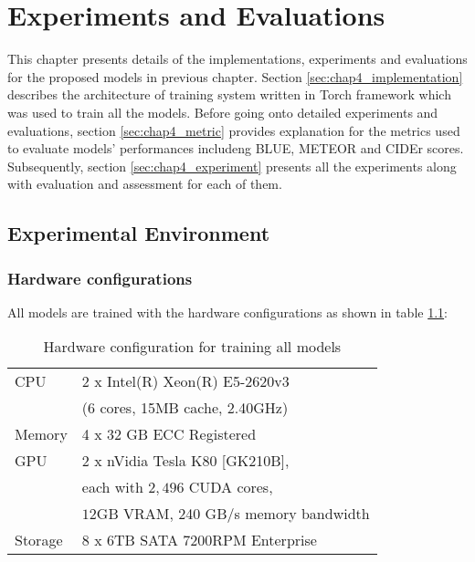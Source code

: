 \chapter{Experiments and Evaluations}
\label{chap:experiments}

This chapter presents details of the implementations, experiments and evaluations for the proposed models in previous chapter. Section \ref{sec:chap4_implementation} describes the architecture of training system written in Torch framework which was used to train all the models. Before going onto detailed experiments and evaluations, section \ref{sec:chap4_metric} provides explanation for the metrics used to evaluate models' performances includeng BLUE, METEOR and CIDEr scores. Subsequently, section \ref{sec:chap4_experiment} presents all the experiments along with evaluation and assessment for each of them.


\section{Experimental Environment}
\label{sec:chap4_environment}

\subsection{Hardware configurations}
\label{sec:hardware}
All models are trained with the hardware configurations as shown in table \ref{tab:hardware_configuration}:

\begin{table}
	\centering
	\caption{Hardware configuration for training all models}	
	\label{tab:hardware_configuration}
	\begin{tabularx}{0.65\textwidth}{ll}
		\toprule
		CPU & 2 x Intel(R) Xeon(R) E5-2620v3 \\
			& (6 cores, 15MB cache, 2.40GHz) \\
		\midrule
		Memory & 4 x 32 GB ECC Registered \\
		\midrule 
		GPU & 2 x nVidia Tesla K80 [GK210B], \\
			& each with $2,496$ CUDA cores, \\
			& $12$GB VRAM, 240 GB/s memory bandwidth \\
		\midrule
		Storage & 8 x 6TB SATA 7200RPM Enterprise \\
		\bottomrule
	\end{tabularx}
\end{table}



